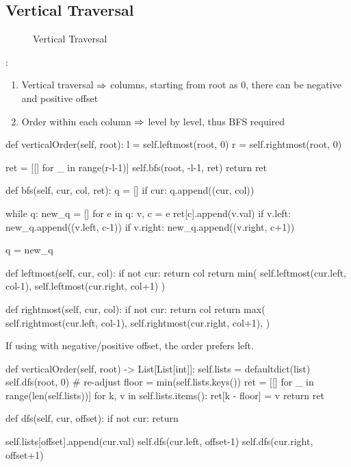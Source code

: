 \subsection{Vertical Traversal}
\begin{figure}[hbtp]
\centering
{}
\caption{Vertical Traversal}
\label{fig:vertical_traversal}
\end{figure}
:
\begin{enumerate}
\item Vertical traversal $\Rightarrow$ columns, starting from root as 0, there can be negative and positive offset
\item Order within each column $\Rightarrow$ level by level, thus BFS required
\end{enumerate}
\begin{python}
def verticalOrder(self, root):
    l = self.leftmost(root, 0)
    r = self.rightmost(root, 0)

    ret = [[] for _ in range(r-l-1)]
    self.bfs(root, -l-1, ret)
    return ret

def bfs(self, cur, col, ret):
    q = []
    if cur:
        q.append((cur, col))

    while q:
        new_q = []
        for e in q:
            v, c = e
            ret[c].append(v.val)
            if v.left:
                new_q.append((v.left, c-1))
            if v.right:
                new_q.append((v.right, c+1))

        q = new_q

def leftmost(self, cur, col):
    if not cur: 
        return col
    return min(
        self.leftmost(cur.left, col-1), 
        self.leftmost(cur.right, col+1)
    )

def rightmost(self, cur, col):
    if not cur: 
        return col
    return max(
        self.rightmost(cur.left, col-1), 	
        self.rightmost(cur.right, col+1),
    )
\end{python}

If using  with negative/positive offset, the order prefers left.
\begin{python}
def verticalOrder(self, root) -> List[List[int]]:
    self.lists = defaultdict(list)
    self.dfs(root, 0)
    # re-adjust
    floor = min(self.lists.keys())
    ret = [[] for _ in range(len(self.lists))]
    for k, v in self.lists.items():
        ret[k - floor] = v
    return ret

def dfs(self, cur, offset):
    if not cur:
        return 

    self.lists[offset].append(cur.val)
    self.dfs(cur.left, offset-1)
    self.dfs(cur.right, offset+1)
\end{python}
